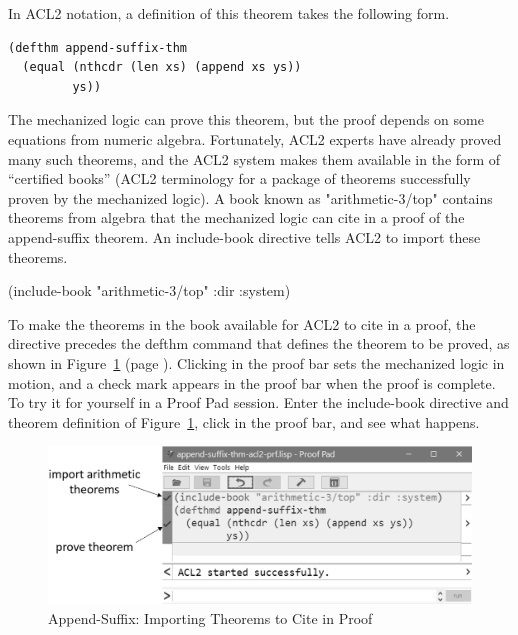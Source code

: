 In ACL2 notation, a definition of this theorem takes the following form.

\begin{Verbatim}
(defthm append-suffix-thm
  (equal (nthcdr (len xs) (append xs ys))
         ys))
\end{Verbatim}

The mechanized logic can prove this theorem, but
the proof depends on some equations from numeric algebra.
Fortunately, ACL2 experts have already proved many such theorems,
and the ACL2 system makes them available in the form of
``certified books''
(ACL2 terminology for a package of theorems successfully proven by the
mechanized logic).
A book known as
\label{arith-top-book} "arithmetic-3/top"
contains theorems from algebra
that the mechanized logic can cite in
a proof of the append-suffix theorem.
An include-book directive tells ACL2
to import these theorems.
\begin{center}
(include-book "arithmetic-3/top" :dir :system)
\end{center}

To make the theorems in the book available
for ACL2 to cite in a proof,
the directive precedes the defthm command that
defines the theorem to be proved, as shown in
Figure~\ref{fig:append-suffix-acl2-prf} (page \pageref{fig:append-suffix-acl2-prf}).
Clicking in the proof bar sets the mechanized logic in motion,
and a check mark appears in the proof bar when
the proof is complete.
To try it for yourself in a Proof Pad session.
Enter the include-book directive
and theorem definition of Figure~\ref{fig:append-suffix-acl2-prf},
click in the proof bar, and see what happens.

\begin{figure}
\begin{center}
\includegraphics[scale=0.5]{images/append-suffix-thm-acl2-prf-bw.png}
\end{center}
\caption{Append-Suffix: Importing Theorems to Cite in Proof}
\label{fig:append-suffix-acl2-prf}
\end{figure}

